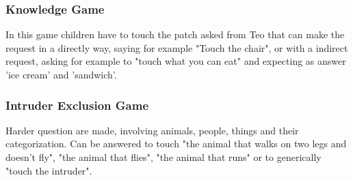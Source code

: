 \subsubsection{Knowledge Game}
In this game children have to touch the patch asked from Teo that can make the request in a directly way, saying for example "Touch the chair", or with a indirect request, asking for example to "touch what you can eat" and expecting as answer 'ice cream' and 'sandwich'.
\subsubsection{Intruder Exclusion Game}
Harder question are made, involving animals, people, things and their categorization. Can be answered to touch "the animal that walks on two legs and doesn't fly", "the animal that flies", "the animal that runs" or to generically "touch the intruder".  